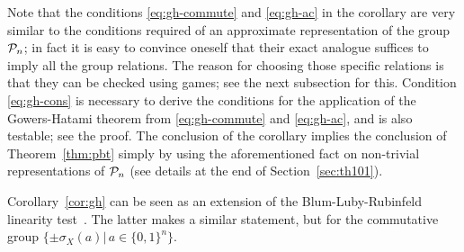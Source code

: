 Note that the conditions \eqref{eq:gh-commute} and \eqref{eq:gh-ac} in the corollary are very similar to the conditions required of an approximate representation of the group $\mathcal{P}_n$; in fact it is easy to convince oneself that their exact analogue suffices to imply all the group relations. The reason for choosing those specific relations is that they can be checked using games; see the next subsection for this. Condition \eqref{eq:gh-cons} is necessary to derive the conditions for the application of the Gowers-Hatami theorem from \eqref{eq:gh-commute} and \eqref{eq:gh-ac}, and is also testable; see the proof. The conclusion of the corollary implies the conclusion of Theorem~\ref{thm:pbt} simply by using the aforementioned fact on non-trivial representations of $\mathcal{P}_n$ (see details at the end of Section~\ref{sec:th101}). 

\begin{remark}
Corollary~\ref{cor:gh} can be seen as an extension of the Blum-Luby-Rubinfeld linearity test~\cite{blum1993self}. The latter makes a similar statement, but for the commutative group $\{\pm\sigma_X(a)|\, a\in\{0,1\}^n\}$. 
\end{remark}


